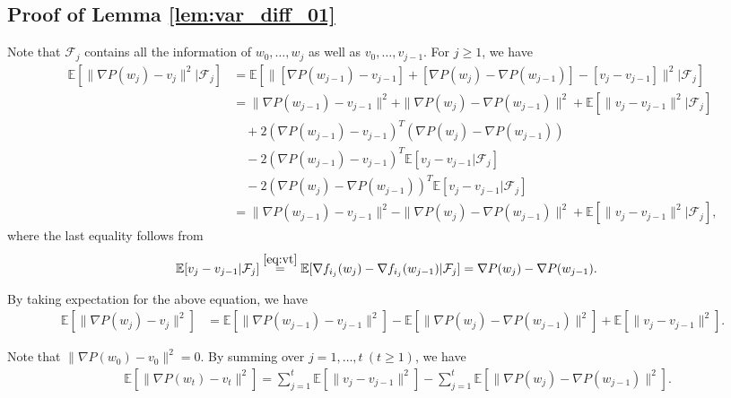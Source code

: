\documentclass{article}
\renewcommand{\top}{T}
\begin{document}
\subsection{Proof of Lemma \ref{lem:var_diff_01}}
Note that $\mathcal{F}_{j}$ contains all the information of $w_{0},\dots,w_{j}$ as well as $v_0,\dots,v_{j-1}$. For $j \geq 1$, we have
\begin{align*}
\mathbb{E}[ \| \nabla P(w_{j}) - v_{j} \|^2 | \mathcal{F}_{j} ] 
& = \mathbb{E}[ \| [\nabla P(w_{j-1}) - v_{j-1} ] + [ \nabla P(w_{j}) - \nabla P(w_{j-1}) ]  - [ v_{j} - v_{j-1} ] \|^2 | \mathcal{F}_{j} ]
\\%
& = \| \nabla P(w_{j-1}) - v_{j-1} \|^2 + \| \nabla P(w_{j}) - \nabla P(w_{j-1}) \|^2 + \mathbb{E} [ \| v_{j} - v_{j-1}  \|^2 | \mathcal{F}_{j} ] 
\\%
&\quad + 2 ( \nabla P(w_{j-1}) - v_{j-1} )^\top ( \nabla P(w_{j}) - \nabla P(w_{j-1}) ) \\
&\quad - 2 ( \nabla P(w_{j-1}) - v_{j-1} )^\top \mathbb{E}[ v_{j} - v_{j-1} | \mathcal{F}_{j} ]  \\
&\quad - 2 ( \nabla P(w_{j}) - \nabla P(w_{j-1}) )^\top \mathbb{E}[ v_{j} - v_{j-1} | \mathcal{F}_{j} ] 
\\%
& = \| \nabla P(w_{j-1}) - v_{j-1} \|^2 - \| \nabla P(w_{j}) - \nabla P(w_{j-1}) \|^2 + \mathbb{E} [ \| v_{j} - v_{j-1}  \|^2 | \mathcal{F}_{j} ], 
\end{align*}
where the last equality follows from
\begin{align*}
& \mathbb{E}[ v_{j} - v_{j-1} | \mathcal{F}_{j} ] \overset{\eqref{eq:vt}}{= }\mathbb{E}[ \nabla f_{i_{j}}(w_{j}) - \nabla f_{i_{j}}(w_{j-1}) | \mathcal{F}_{j} ] 
= \nabla P(w_{j}) - \nabla P(w_{j-1}).
\end{align*}

By taking expectation for the above equation, we have
\begin{align*}
\mathbb{E}[ \| \nabla P(w_{j}) - v_{j} \|^2 ] &= \mathbb{E}[ \| \nabla P(w_{j-1}) - v_{j-1} \|^2 ] - \mathbb{E}[ \| \nabla P(w_{j}) - \nabla P(w_{j-1}) \|^2 ] + \mathbb{E}[ \| v_{j} - v_{j-1} \|^2 ]. 
\end{align*}

Note that $\| \nabla P(w_{0}) - v_{0} \|^2 = 0$. By summing over $j = 1,\dots,t\ (t\geq 1)$, we have
\begin{align*}
& \mathbb{E}[ \| \nabla P(w_{t}) - v_{t} \|^2 ]  = \sum_{j = 1}^{t} \mathbb{E}[ \| v_{j} - v_{j-1} \|^2 ]  - \sum_{j = 1}^{t} \mathbb{E}[ \| \nabla P(w_{j}) - \nabla P(w_{j-1}) \|^2 ]. 
\end{align*}
\end{document}
